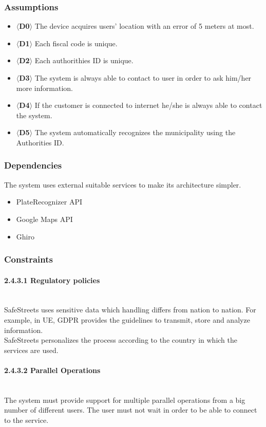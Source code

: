 \documentclass{article}
\begin{document}
\subsubsection{Assumptions}
\begin{itemize}
    \item $\langle$\textbf{D0}$\rangle$ The device acquires users' location with
    an error of 5 meters at most.
    \item $\langle$\textbf{D1}$\rangle$ Each fiscal code is unique.
    \item $\langle$\textbf{D2}$\rangle$ Each authorithies ID is unique.
    \item $\langle$\textbf{D3}$\rangle$ The system is always able to contact to
    user in order to ask him/her more information.
    \item $\langle$\textbf{D4}$\rangle$ If the customer is connected to internet
    he/she is always able to contact the system.
    \item $\langle$\textbf{D5}$\rangle$ The system automatically recognizes the
    municipality using the Authorities ID.
\end{itemize}
\subsubsection{Dependencies}
The system uses external suitable services to make its architecture simpler.
\begin{itemize}
    \item PlateRecognizer API
    \item Google Maps API
    \item Ghiro
\end{itemize}
\subsubsection{Constraints}
\paragraph{2.4.3.1 Regulatory policies}\mbox{}\\
SafeStreets uses sensitive data which handling differs from nation to nation.
For example, in UE, GDPR provides the guidelines to transmit, store and analyze
information.\\ SafeStreets personalizes the process according to the country in
which the services are used.
\paragraph{2.4.3.2 Parallel Operations}\mbox{}\\
The system must provide support for multiple parallel operations from a big
number of different users. The user must not wait in order to be able to connect
to the service.
\end{document}
